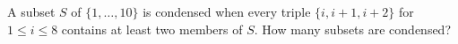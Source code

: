 A subset $S$ of $\{1,\ldots,10\}$ is condensed when every triple $\{i,i+1,i+2\}$ for $1\le i\le 8$ contains at least two members of $S$. How many subsets are condensed?
